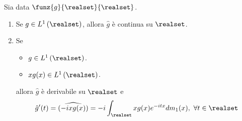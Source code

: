 \begin{theorema}
	Sia data $\funz{g}{\realset}{\realset}$.
	\begin{enumerate}
		\item Se $g\in L^1\left(\realset\right)$, allora $\hat{g}$ è continua su $\realset$.
		\item Se
		\begin{itemize}
			\item $g\in L^1\left(\realset\right)$.
			\item $xg(x)\in L^1\left(\realset\right)$.
		\end{itemize}
		allora $\hat{g}$ è derivabile su $\realset$ e
		\begin{equation}
			\hat{g}'(t)=\widehat{\left(-ixg(x)\right)}=-i\int_{\realset}xg(x)e^{-itx}dm_1(x),\ \forall t\in\realset
		\end{equation}
	\end{enumerate}
\end{theorema}
